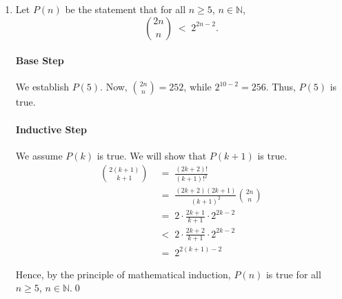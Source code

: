 \documentclass[10pt]{article}
\begin{document}
\begin{enumerate}
                Hence, by the principle of mathematical induction, $P(n)$ is true for all $n \in \mathbb{N}$.\qed\\

                \item Let $P(n)$ be the statement that for all $n \geq 5$, $n \in \mathbb{N}$,
                \[\binom{2n}{n} \;<\; 2^{2n - 2}.\]
                \paragraph{Base Step}
                We establish $P(5)$. Now, $\binom{2n}{n} = 252$, while $2^{10 - 2} = 256$. Thus, $P(5)$ is true.
                \paragraph{Inductive Step}
                We assume $P(k)$ is true. We will show that $P(k + 1)$ is true.
                \begin{align*}
                \binom{2(k + 1)}{k + 1} \;&=\; \frac{(2k + 2)!}{(k + 1)!^2} \\
                        \;&=\; \frac{(2k + 2)(2k + 1)}{(k + 1)^2} \binom{2n}{n} \\
                        \;&=\; 2\cdot \frac{2k + 1}{k + 1} \cdot 2^{2k - 2} \\
                        \;&<\; 2\cdot \frac{2k + 2}{k + 1} \cdot 2^{2k - 2} \\
                        \;&=\; 2^{2(k + 1) - 2}
                \end{align*}
                
                Hence, by the principle of mathematical induction, $P(n)$ is true for all $n \geq 5$, $n \in \mathbb{N}$.\qed\\
        \end{enumerate}
        
\end{document}
